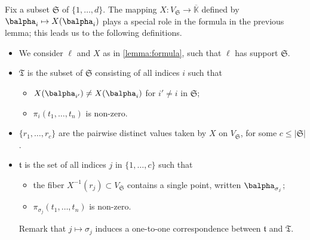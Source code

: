 \documentclass[12pt]{article}
\newcommand{\lf}{X}
\def\Kbar {{\ensuremath{\overline{\mathbb{K}}}}}
\begin{document}
Fix a subset $\mathfrak{S}$ of $\{1,\dots,d\}$. The mapping
$\lf:V_\mathfrak{S} \to \Kbar$ defined by $\balpha_i \mapsto
\lf(\balpha_{i})$ plays a special role in the formula in the previous
lemma; this leads us to the following definitions.
\begin{itemize}
\item We consider $\ell$ and $\lf$ as in \cref{lemma:formula}, such
  that $\ell$ has support $\mathfrak{S}$.
\item $\mathfrak{T}$ is the subset of $\mathfrak{S}$ consisting of
  all indices $i$ such that 
  \begin{itemize}
  \item $\lf(\balpha_{i'}) \ne \lf(\balpha_i)$ for $i' \ne i$ in $\mathfrak{S}$;
  \item $\pi_i(t_1,\dots,t_n)$ is non-zero.
  \end{itemize}
\item $\{r_1,\dots,r_c\}$ are the pairwise distinct values taken by $\lf$ on
  $V_\mathfrak{S}$, for some $c \le |\mathfrak{S}|$.
\item $\mathfrak{t}$ is the set of all indices $j$ in
  $\{1,\dots,c\}$ such that
  \begin{itemize}
  \item the fiber $\lf^{-1}(r_j) \subset V_{\mathfrak{S}}$ contains a single
    point, written $\balpha_{\sigma_j}$;
  \item   $\pi_{\sigma_j}(t_1,\dots,t_n)$ is non-zero.
  \end{itemize}
  Remark that $j \mapsto \sigma_j$ induces a one-to-one correspondence
  between  $\mathfrak{t}$ and  $\mathfrak{T}$.
\end{itemize}
\end{document}
